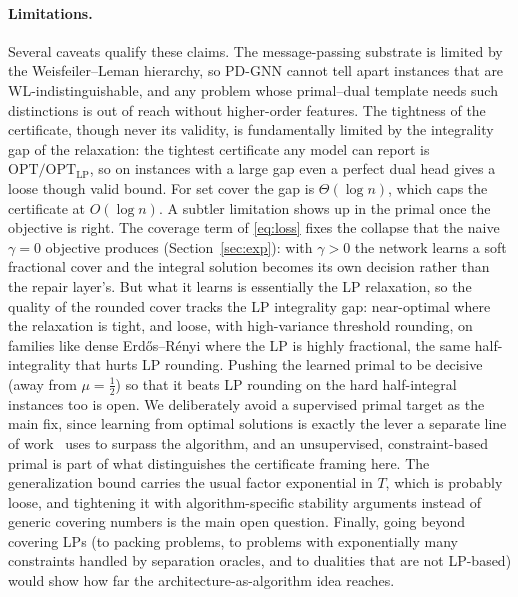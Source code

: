 \documentclass[11pt]{article}
\theoremstyle{plain}
\theoremstyle{definition}
\theoremstyle{remark}
\newcommand{\OPT}{\mathrm{OPT}}
\newcommand{\OPTLP}{\mathrm{OPT}_{\mathrm{LP}}}
\newcommand{\PDGNN}{\textsc{PD-GNN}}
\begin{document}
\paragraph{Limitations.}
Several caveats qualify these claims. The message-passing substrate is limited by
the Weisfeiler--Leman hierarchy, so \PDGNN{} cannot tell apart instances that are
WL-indistinguishable, and any problem whose primal--dual template needs such
distinctions is out of reach without higher-order features. The tightness of the
certificate, though never its validity, is fundamentally limited by the
integrality gap of the relaxation: the tightest certificate any model can report
is $\OPT/\OPTLP$, so on instances with a large gap even a perfect dual head gives
a loose though valid bound. For set cover the gap is $\Theta(\log n)$, which caps
the certificate at $O(\log n)$. A subtler limitation shows up in the primal once
the objective is right. The coverage term of \eqref{eq:loss} fixes the collapse
that the naive $\gamma=0$ objective produces (Section~\ref{sec:exp}): with
$\gamma>0$ the network learns a soft fractional cover and the integral solution
becomes its own decision rather than the repair layer's. But what it learns is
essentially the LP relaxation, so the quality of the rounded cover tracks the LP
integrality gap: near-optimal where the relaxation is tight, and loose, with
high-variance threshold rounding, on families like dense Erd\H{o}s--R\'enyi where
the LP is highly fractional, the same half-integrality that hurts LP rounding.
Pushing the learned primal to be decisive (away from $\mu=\tfrac12$) so that it
beats LP rounding on the hard half-integral instances too is open. We
deliberately avoid a supervised primal target as the main fix, since learning
from optimal solutions is exactly the lever a separate line of
work~\citep{he2025primal} uses to surpass the algorithm, and an unsupervised,
constraint-based primal is part of what distinguishes the certificate framing
here. The generalization bound carries the usual
factor exponential in $T$, which is probably loose, and tightening it with
algorithm-specific stability arguments instead of generic covering numbers is the
main open question. Finally, going beyond covering LPs (to packing problems, to
problems with exponentially many constraints handled by separation oracles, and
to dualities that are not LP-based) would show how far the
architecture-as-algorithm idea reaches.



\end{document}
